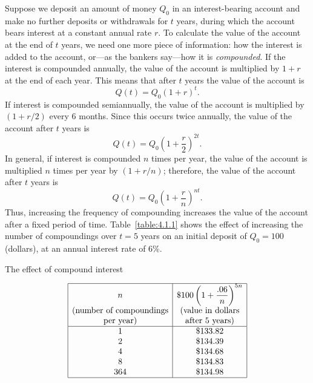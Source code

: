 
\noindent
Suppose we deposit an amount of money $Q_{0}$ in an interest-bearing account and make no further
deposits or withdrawals for $t$ years, during which the account bears interest at a constant annual
rate $r$. To calculate the value of the account at the end of $t$ years, we need one more piece of
information: how the interest is added to the account, or---as the bankers say---how it is
{\color{blue}\it compounded}. If the interest is compounded annually, the value of the account is
multiplied by $1+r$ at the end of each year. This means that after $t$ years the value of the
account is
\[
  Q(t)=Q_{0}(1+r)^{t}.
\]
If interest is compounded semiannually, the value of the account is multiplied by $(1+r/2)$ every 6
months. Since this occurs twice annually, the value of the account after $t$ years is
\[
  Q(t)=Q_{0}\left(1+\frac{r}{2}\right)^{2t}.
\]
In general, if interest is compounded $n$ times per year, the value of the account is multiplied $n$
times per year by $(1+r/n)$; therefore, the value of the account after $t$ years is
\begin{equation}
  \label{eq:4.1.8}Q(t)=Q_{0}\left(1+\frac{r}{n}\right)^{nt}.
\end{equation}
Thus, increasing the frequency of compounding increases the value of the account after a fixed
period of time. Table~\ref{table:4.1.1} shows the effect of increasing the number of compoundings
over $t=5$ years on an initial deposit of $Q_{0}=100$ (dollars), at an annual interest rate of 6\%.

\medskip

\begin{newtable}
  \label{table:4.1.1} The effect of compound interest
  \begin{center}
    \[
      \begin{array}{|c|c|}
        \hline
        n                              & \displaystyle\$100\left(1+\frac{.06}{n}\right)^{5n} \\
        \hbox{(number of compoundings} & \hbox{(value in dollars}                   \\
        \hbox{per year)}               & \hbox{after 5 years)}                      \\
        \hline
        1                              & \$133.82                                   \\
        2                              & \$134.39                                   \\
        4                              & \$134.68                                   \\
        8                              & \$134.83                                   \\
        364                            & \$134.98                                   \\
        \hline
      \end{array}
    \]
  \end{center}
\end{newtable}

